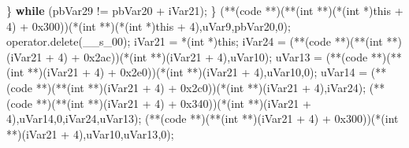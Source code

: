 \documentclass[
]{article}
\newenvironment{Shaded}{}{}
\newcommand{\BaseNTok}[1]{\textcolor[rgb]{0.25,0.63,0.44}{#1}}
\newcommand{\ControlFlowTok}[1]{\textcolor[rgb]{0.00,0.44,0.13}{\textbf{#1}}}
\newcommand{\DataTypeTok}[1]{\textcolor[rgb]{0.56,0.13,0.00}{#1}}
\newcommand{\DecValTok}[1]{\textcolor[rgb]{0.25,0.63,0.44}{#1}}
\newcommand{\NormalTok}[1]{#1}
\newcommand{\OperatorTok}[1]{\textcolor[rgb]{0.40,0.40,0.40}{#1}}
\begin{document}
\begin{Shaded}
\begin{Highlighting}[]
    \OperatorTok{\}} \ControlFlowTok{while} \OperatorTok{(}\NormalTok{pbVar29 }\OperatorTok{!=}\NormalTok{ pbVar20 }\OperatorTok{+}\NormalTok{ iVar21}\OperatorTok{);}
  \OperatorTok{\}}
  \OperatorTok{(**(}\NormalTok{code }\OperatorTok{**)(**(}\DataTypeTok{int} \OperatorTok{**)(*(}\DataTypeTok{int} \OperatorTok{*)}\NormalTok{this }\OperatorTok{+} \DecValTok{4}\OperatorTok{)} \OperatorTok{+} \BaseNTok{0x300}\OperatorTok{))(*(}\DataTypeTok{int} \OperatorTok{**)(*(}\DataTypeTok{int} \OperatorTok{*)}\NormalTok{this }\OperatorTok{+} \DecValTok{4}\OperatorTok{),}\NormalTok{uVar9}\OperatorTok{,}\NormalTok{pbVar20}\OperatorTok{,}\DecValTok{0}\OperatorTok{);}
\NormalTok{  operator}\OperatorTok{.}\NormalTok{delete}\OperatorTok{(}\NormalTok{\_\_s\_00}\OperatorTok{);}
\NormalTok{  iVar21 }\OperatorTok{=} \OperatorTok{*(}\DataTypeTok{int} \OperatorTok{*)}\NormalTok{this}\OperatorTok{;}
\NormalTok{  iVar24 }\OperatorTok{=} \OperatorTok{(**(}\NormalTok{code }\OperatorTok{**)(**(}\DataTypeTok{int} \OperatorTok{**)(}\NormalTok{iVar21 }\OperatorTok{+} \DecValTok{4}\OperatorTok{)} \OperatorTok{+} \BaseNTok{0x2ac}\OperatorTok{))(*(}\DataTypeTok{int} \OperatorTok{**)(}\NormalTok{iVar21 }\OperatorTok{+} \DecValTok{4}\OperatorTok{),}\NormalTok{uVar10}\OperatorTok{);}
\NormalTok{  uVar13 }\OperatorTok{=} \OperatorTok{(**(}\NormalTok{code }\OperatorTok{**)(**(}\DataTypeTok{int} \OperatorTok{**)(}\NormalTok{iVar21 }\OperatorTok{+} \DecValTok{4}\OperatorTok{)} \OperatorTok{+} \BaseNTok{0x2e0}\OperatorTok{))(*(}\DataTypeTok{int} \OperatorTok{**)(}\NormalTok{iVar21 }\OperatorTok{+} \DecValTok{4}\OperatorTok{),}\NormalTok{uVar10}\OperatorTok{,}\DecValTok{0}\OperatorTok{);}
\NormalTok{  uVar14 }\OperatorTok{=} \OperatorTok{(**(}\NormalTok{code }\OperatorTok{**)(**(}\DataTypeTok{int} \OperatorTok{**)(}\NormalTok{iVar21 }\OperatorTok{+} \DecValTok{4}\OperatorTok{)} \OperatorTok{+} \BaseNTok{0x2c0}\OperatorTok{))(*(}\DataTypeTok{int} \OperatorTok{**)(}\NormalTok{iVar21 }\OperatorTok{+} \DecValTok{4}\OperatorTok{),}\NormalTok{iVar24}\OperatorTok{);}
  \OperatorTok{(**(}\NormalTok{code }\OperatorTok{**)(**(}\DataTypeTok{int} \OperatorTok{**)(}\NormalTok{iVar21 }\OperatorTok{+} \DecValTok{4}\OperatorTok{)} \OperatorTok{+} \BaseNTok{0x340}\OperatorTok{))(*(}\DataTypeTok{int} \OperatorTok{**)(}\NormalTok{iVar21 }\OperatorTok{+} \DecValTok{4}\OperatorTok{),}\NormalTok{uVar14}\OperatorTok{,}\DecValTok{0}\OperatorTok{,}\NormalTok{iVar24}\OperatorTok{,}\NormalTok{uVar13}\OperatorTok{);}
  \OperatorTok{(**(}\NormalTok{code }\OperatorTok{**)(**(}\DataTypeTok{int} \OperatorTok{**)(}\NormalTok{iVar21 }\OperatorTok{+} \DecValTok{4}\OperatorTok{)} \OperatorTok{+} \BaseNTok{0x300}\OperatorTok{))(*(}\DataTypeTok{int} \OperatorTok{**)(}\NormalTok{iVar21 }\OperatorTok{+} \DecValTok{4}\OperatorTok{),}\NormalTok{uVar10}\OperatorTok{,}\NormalTok{uVar13}\OperatorTok{,}\DecValTok{0}\OperatorTok{);}

\end{Highlighting}
\end{Shaded}
\end{document}
